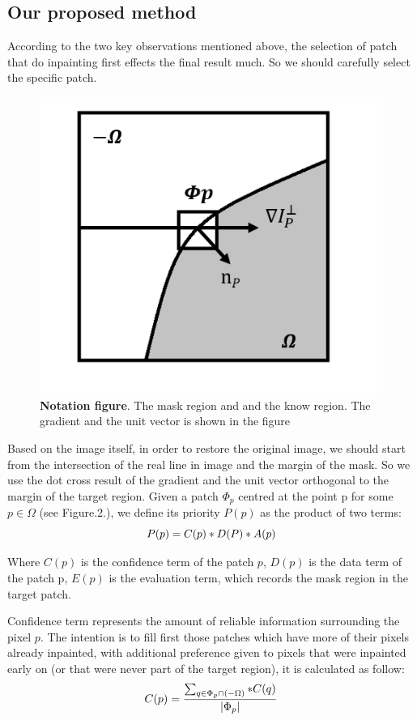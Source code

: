 \subsection{Our proposed method}
According to the two key observations mentioned above, the selection of patch that do inpainting first effects the final result much. So we should carefully select the specific patch. 
\begin{figure}
	\centering
	\includegraphics[width=0.94\linewidth]{region.jpg}
	\caption{\textbf{Notation figure}. The mask region and and the know region. The gradient and the unit vector is shown in the figure}
\end{figure}

Based on the image itself, in order to restore the original image, we should start from the intersection of the real line in image and the margin of the mask. So we use the dot cross result of the gradient and the unit vector orthogonal to the margin of the target region. Given a patch $\Phi_p$ centred at the point p for some $p \in \Omega$ (see Figure.2.), we define its priority $P(p)$ as the product of two terms:
\begin{equation*}
\centering
P(p)=C(p)*D(P)*A(p)
\nonumber
\end{equation*}

Where $C(p)$ is the confidence term of the patch $p$, $D(p)$ is the data term of the patch p, $E(p)$ is the evaluation term, which records the mask region in the target patch. 

Confidence term represents the amount of reliable information surrounding the pixel $p$. The
intention is to fill first those patches which have more of their pixels already inpainted, with additional preference given to pixels that were inpainted early on (or that were never part of the target region), it is calculated as follow:
\begin{equation*}
\centering
C(p)=\frac{\sum_{q\in \Phi _p\cap(-\Omega)}*C(q)}{|\Phi_p|}
\nonumber
\end{equation*}

